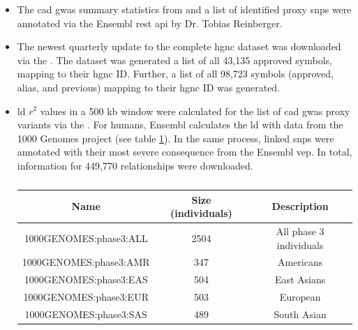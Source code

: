 \begin{itemize}
    \item {} The \ac{cad} \ac{gwas} summary statistics from \textcite{aragamDiscoverySystematicCharacterization2021} and a list of identified proxy \acp{snp} were annotated via the Ensembl \ac{rest} \ac{api} by Dr. Tobias Reinberger.

    \item {} The newest quarterly update to the complete \ac{hgnc} dataset was downloaded via the . The dataset was generated a list of all 43,135 approved symbols, mapping to their \ac{hgnc} ID. Further, a list of all 98,723 symbols (approved, alias, and previous) mapping to their \ac{hgnc} ID was generated.

    \item {} \ac{ld} $r^2$ values in a 500 kb window were calculated for the list of \ac{cad} \ac{gwas} proxy variants via the . For humans, Ensembl calculates the \ac{ld} with data from the 1000 Genomes project (see table \ref{tab:populations}). In the same process, linked \acp{snp} were annotated with their most severe consequence from the Ensembl \ac{vep}. In total, information for 449,770 relationships were downloaded.

    \begin{table}[h]
    \capstart
    \centering
    \begin{minipage}{\captionwidth}
        \caption[1000 Genomes Populations]{}
        \label{tab:populations}
    \end{minipage}
    \begin{tabular}{|c|c|c|}
        \hline
        Name                   & Size (individuals)   & Description      \\ \hline
        1000GENOMES:phase3:ALL & 2504                 & All phase 3 individuals  \\
        1000GENOMES:phase3:AMR & 347                  & Americans  \\
        1000GENOMES:phase3:EAS & 504                  & East Asians  \\
        1000GENOMES:phase3:EUR & 503                  & European \\
        1000GENOMES:phase3:SAS & 489                  & South Asian  \\ \hline
    \end{tabular}
    \end{table}


\end{itemize}
